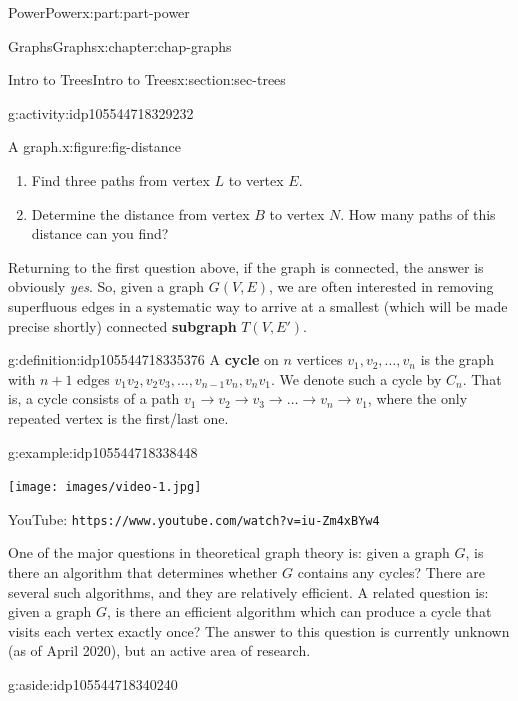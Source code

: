 \documentclass[oneside,10pt,]{book}
\newcommand{\mono}[1]{\texttt{#1}}
\newcommand{\terminology}[1]{\textbf{#1}}
\numberwithin{equation}{section}
\newlength{\qrsize}
\newlength{\previewwidth}
\begin{document}
\begin{partptx}{Power}{}{Power}{}{}{x:part:part-power}
\begin{chapterptx}{Graphs}{}{Graphs}{}{}{x:chapter:chap-graphs}
\begin{sectionptx}{Intro to Trees}{}{Intro to Trees}{}{}{x:section:sec-trees}
\begin{activity}{}{g:activity:idp105544718329232}
\begin{figureptx}{A graph.}{x:figure:fig-distance}{}
\begin{image}{0.25}{0.5}{0.25}
\end{image}%
\tcblower
\end{figureptx}%
%
\begin{enumerate}
\item{}Find three paths from vertex \(L\) to vertex \(E\).%
\item{}Determine the distance from vertex \(B\) to vertex \(N\). How many paths of this distance can you find?%
\end{enumerate}
\end{activity}%
Returning to the first question above, if the graph is connected, the answer is obviously \emph{yes}. So, given a graph \(G(V,E)\), we are often interested in removing superfluous edges in a systematic way to arrive at a smallest (which will be made precise shortly) connected \terminology{subgraph} \(T(V,E')\).%
\begin{definition}{}{g:definition:idp105544718335376}%
A \terminology{cycle} on \(n\) vertices \(v_1, v_2, \ldots, v_n\) is the graph with \(n+1\) edges \(v_1 v_2, v_2 v_3, \ldots, v_{n-1} v_n, v_n v_1\). We denote such a cycle by \(C_n\). That is, a cycle consists of a path \(v_1 \to v_2 \to v_3 \to \ldots \to v_n \to v_1\), where the only repeated vertex is the first\slash{}last one.%
\end{definition}
\begin{example}{}{g:example:idp105544718338448}%
\setlength{\qrsize}{9em}
\setlength{\previewwidth}{\linewidth}
\addtolength{\previewwidth}{-\qrsize}
\begin{tcbraster}[raster columns=2, raster column skip=1pt, raster halign=center, raster force size=false, raster left skip=0pt, raster right skip=0pt]%
\begin{tcolorbox}[previewstyle, width=\previewwidth]%
\texttt{[image: images/video-1.jpg]}%
\end{tcolorbox}%
\begin{tcolorbox}[qrstyle]%
{\hypersetup{urlcolor=black}}%
\end{tcolorbox}%
\begin{tcolorbox}[captionstyle]%
\small YouTube: \mono{https://www.youtube.com/watch?v=iu-Zm4xBYw4}\end{tcolorbox}%
\end{tcbraster}%
\end{example}
One of the major questions in theoretical graph theory is: given a graph \(G\), is there an algorithm that determines whether \(G\) contains any cycles? There are several such algorithms, and they are relatively efficient. A related question is: given a graph \(G\), is there an efficient algorithm which can produce a cycle that visits each vertex exactly once? The answer to this question is currently unknown (as of April 2020), but an active area of research. \begin{aside}{}{g:aside:idp105544718340240}%

\end{aside}
\end{sectionptx}
\end{chapterptx}
\end{partptx}
\end{document}
